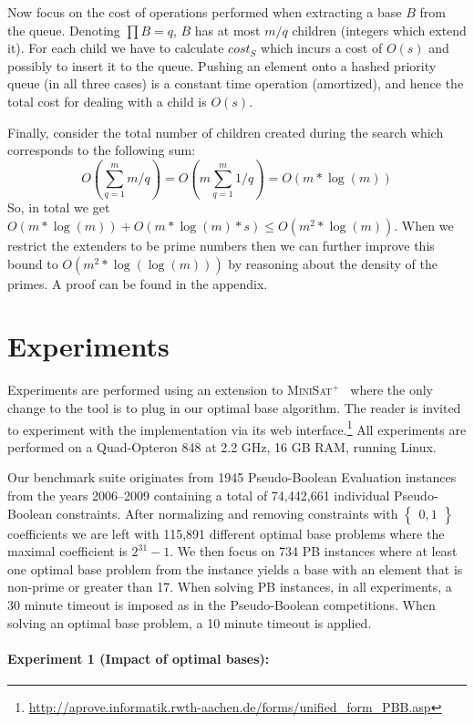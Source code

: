 \documentclass[envcountsame]{llncs}
\newcommand\minisatp{\textsc{MiniSat$^+$}}
\newcommand{\set}[1]{\left\{
      \begin{array}{l}#1\end{array}
        \right\}}
\begin{document}
Now focus on the cost of operations performed when extracting a
base $B$ from the queue. Denoting
$\prod B=q$,
$B$ has at most $m/q$
children (integers which extend it). 
For each child we have to calculate $cost_S$ which incurs a cost of
$O(s)$ 
and possibly to insert it to the queue.
Pushing an element onto a hashed priority queue (in all three cases)
is a constant time operation (amortized), and hence the total cost for
dealing with a child is $O(s)$.

Finally, consider the total number of children created during
the search which corresponds to the following sum:
\vspace{-2mm}
\[  
  O(\sum_{q=1}^{m}m/q ) = O(m\sum_{q=1}^{m}1/q)=O(m*\log(m)) 
\] 
So, in total we get $O(m*\log(m))+O(m*\log(m)*s)\leq O(m^2 *
\log(m))$. 
When we restrict the extenders to be prime numbers then we can further
improve this bound to $O(m^2 * \log(\log(m)))$ by reasoning about the
density of the primes. 
A proof can be found in the appendix.
\section{Experiments}
\label{sec:exp}


Experiments are performed using an extension to \minisatp\
\cite{EenS06} where the only change to the tool is to plug in our
optimal base algorithm.
The reader is invited to experiment with the implementation via its
web interface.\footnote{
  \url{http://aprove.informatik.rwth-aachen.de/forms/unified_form_PBB.asp}}
All experiments are performed on a Quad-Opteron 848 at 2.2 GHz, 16 GB
RAM, running Linux.

Our benchmark suite originates from 1945 Pseudo-Boolean Evaluation
\cite{Manquinho06}
instances from the years 2006--2009 containing a total of 
74,442,661 individual Pseudo-Boolean constraints. After 
normalizing and removing constraints with $\set{0,1}$ coefficients we
are left with 115,891 different optimal base problems where the
maximal coefficient is $2^{31}-1$.
We then focus on 734
PB instances where at least one optimal base
problem from the instance yields a base with an element that is
non-prime or greater than 17.
When solving PB instances, in all experiments, a 30 minute timeout is
imposed as in the Pseudo-Boolean competitions. When solving an optimal
base problem, a 10 minute timeout is applied.


\paragraph{Experiment 1 (Impact of optimal bases):}
\end{document}
